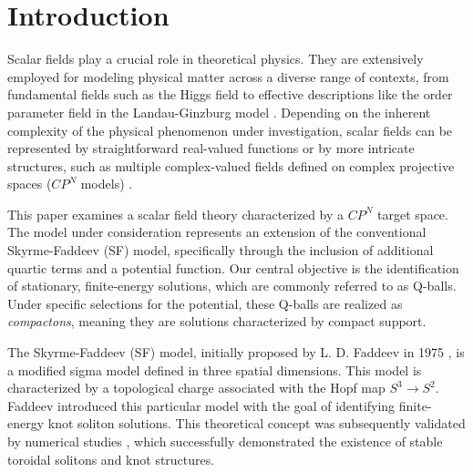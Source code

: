 \documentclass[aps,prd,superscriptaddress,notitlepage,11pt,final,longbibliography,nofootinbib]{revtex4-1}
\numberwithin{equation}{section}
\begin{document}
\maketitle

\section{Introduction}
Scalar fields play a crucial role in theoretical physics. They are extensively employed for modeling physical matter across a diverse range of contexts, from fundamental fields such as the Higgs field \cite{PhysRevLett.13.508} to effective descriptions like the order parameter field in the Landau-Ginzburg model \cite{Ginzburg:1950sr}. Depending on the inherent complexity of the physical phenomenon under investigation, scalar fields can be represented by straightforward real-valued functions or by more intricate structures, such as multiple complex-valued fields defined on complex projective spaces ($CP^N$ models) \cite{zakrzewski1988low}.

This paper examines a scalar field theory characterized by a $CP^N$ target space. The model under consideration represents an extension of the conventional Skyrme-Faddeev (SF) model, specifically through the inclusion of additional quartic terms and a potential function. Our central objective is the identification of stationary, finite-energy solutions, which are commonly referred to as Q-balls. Under specific selections for the potential, these Q-balls are realized as {\it compactons}, meaning they are solutions characterized by compact support.

The Skyrme-Faddeev (SF) model, initially proposed by L. D. Faddeev in 1975 \cite{Faddeev:1975tz, Faddeev:1995au}, is a modified sigma model defined in three spatial dimensions. This model is characterized by a topological charge associated with the Hopf map $S^3\rightarrow S^2$. Faddeev introduced this particular model with the goal of identifying finite-energy knot soliton solutions. This theoretical concept was subsequently validated by numerical studies \cite{Battye:1998pe, Sutcliffe:2007ui}, which successfully demonstrated the existence of stable toroidal solitons and knot structures.
\end{document}
